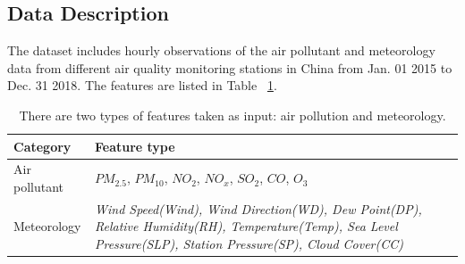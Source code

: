 \subsection{Data Description}
\label{section:datadescription}

The dataset includes hourly observations of the air pollutant and meteorology data from different air quality monitoring stations in China from Jan. 01 2015 to Dec. 31 2018.
The features are listed in Table ~\ref{table:feature_list}.

\begin{table}[h!]
\centering
\begin{tabular}{|p{4cm}|p{8cm}|} 
\hline
 Category & Feature type \\ [0.5ex] 
\hline
    Air pollutant&$PM_{2.5}$, $PM_{10}$, $NO_{2}$, $NO_{x}$, $SO_{2}$, $CO$, $O_3$\\[0.4ex] 
\hline
    Meteorology&\textit{Wind Speed(Wind), Wind Direction(WD), Dew Point(DP), Relative Humidity(RH), Temperature(Temp), Sea Level Pressure(SLP), Station Pressure(SP), Cloud Cover(CC)}\\
\hline
\end{tabular}
\caption{There are two types of features taken as input: air pollution and meteorology. }
\label{table:feature_list}
\end{table}

